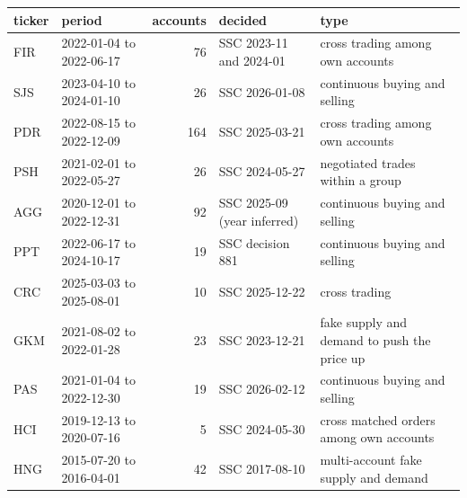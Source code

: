 \begin{tabular}{llrll}
\toprule
ticker & period & accounts & decided & type \\
\midrule
FIR & 2022-01-04 to 2022-06-17 & 76 & SSC 2023-11 and 2024-01 & cross trading among own accounts \\
SJS & 2023-04-10 to 2024-01-10 & 26 & SSC 2026-01-08 & continuous buying and selling \\
PDR & 2022-08-15 to 2022-12-09 & 164 & SSC 2025-03-21 & cross trading among own accounts \\
PSH & 2021-02-01 to 2022-05-27 & 26 & SSC 2024-05-27 & negotiated trades within a group \\
AGG & 2020-12-01 to 2022-12-31 & 92 & SSC 2025-09 (year inferred) & continuous buying and selling \\
PPT & 2022-06-17 to 2024-10-17 & 19 & SSC decision 881 & continuous buying and selling \\
CRC & 2025-03-03 to 2025-08-01 & 10 & SSC 2025-12-22 & cross trading \\
GKM & 2021-08-02 to 2022-01-28 & 23 & SSC 2023-12-21 & fake supply and demand to push the price up \\
PAS & 2021-01-04 to 2022-12-30 & 19 & SSC 2026-02-12 & continuous buying and selling \\
HCI & 2019-12-13 to 2020-07-16 & 5 & SSC 2024-05-30 & cross matched orders among own accounts \\
HNG & 2015-07-20 to 2016-04-01 & 42 & SSC 2017-08-10 & multi-account fake supply and demand \\
\bottomrule
\end{tabular}
